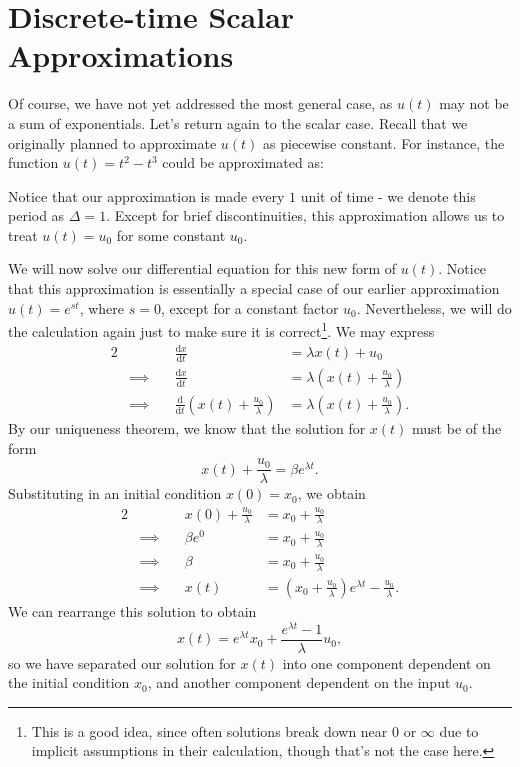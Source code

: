 \documentclass[letterpaper]{article}
\theoremstyle{remark}
\newcommand{\dx}{\mathrm{d}x}
\newcommand{\dt}{\mathrm{d}t}
\newcommand{\diff}{\mathrm{d}}
\newcommand{\eqn}[1]{\begin{alignat*}{2}#1\end{alignat*}}
\newcommand*{\thus}{&\implies\quad&}
\begin{document}
\section{Discrete-time Scalar Approximations}
Of course, we have not yet addressed the most general case, as $u(t)$ may not be a sum of exponentials. Let's return again to the scalar case. Recall that we originally planned to approximate $u(t)$ as piecewise constant. For instance, the function $u(t) = t^2 - t^3$ could be approximated as:
\begin{center}
\end{center}

Notice that our approximation is made every $1$ unit of time - we denote this period as $\Delta = 1$. Except for brief discontinuities, this approximation allows us to treat $u(t) = u_0$ for some constant $u_0$.

We will now solve our differential equation for this new form of $u(t)$. Notice that this approximation is essentially a special case of our earlier approximation $u(t) = e^{st}$, where $s = 0$, except for a constant factor $u_0$. Nevertheless, we will do the calculation again just to make sure it is correct\footnote{This is a good idea, since often solutions break down near $0$ or $\infty$ due to implicit assumptions in their calculation, though that's not the case here.}. We may express
\eqn{
    && \frac{\dx}{\dt} &= \lambda x(t) + u_0 \\
    \thus \frac{\dx}{\dt} &= \lambda \left(x(t) + \frac{u_0}{\lambda}\right) \\
    \thus \frac{\diff}{\dt}\left(x(t) + \frac{u_0}{\lambda}\right) &= \lambda \left(x(t) + \frac{u_0}{\lambda}\right).
}
By our uniqueness theorem, we know that the solution for $x(t)$ must be of the form
\[
    x(t) + \frac{u_0}{\lambda} = \beta e^{\lambda t}.
\]
Substituting in an initial condition $x(0) = x_0$, we obtain
\eqn{
    && x(0) + \frac{u_0}{\lambda} &= x_0 + \frac{u_0}{\lambda} \\
    \thus \beta e^{0} &= x_0 + \frac{u_0}{\lambda} \\
    \thus \beta &= x_0 + \frac{u_0}{\lambda} \\
    \thus x(t) &= \left(x_0 + \frac{u_0}{\lambda}\right)e^{\lambda t} - \frac{u_0}{\lambda}.
}
We can rearrange this solution to obtain
\[
    x(t) = e^{\lambda t}x_0 + \frac{e^{\lambda t} - 1}{\lambda}u_0,
\]
so we have separated our solution for $x(t)$ into one component dependent on the initial condition $x_0$, and another component dependent on the input $u_0$.
\end{document}
